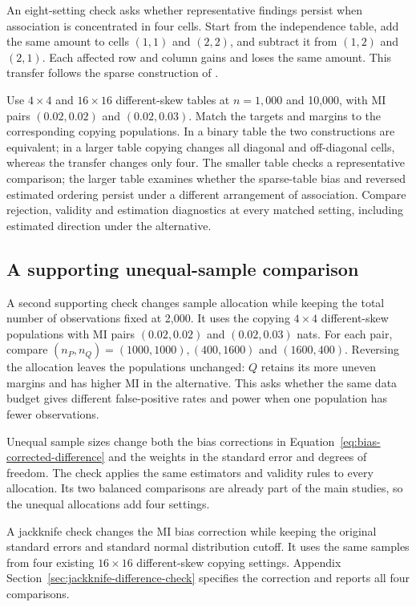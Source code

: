 An eight-setting check asks whether representative findings persist when
association is concentrated in four cells. Start from the independence
table, add the same amount to cells \((1,1)\) and \((2,2)\), and subtract
it from \((1,2)\) and \((2,1)\). Each affected row and column gains and
loses the same amount. This transfer follows the sparse construction of
\citet[Section~3(b)]{berrett2021}.

Use \(4\times4\) and \(16\times16\) different-skew tables at
\(n=1{,}000\) and 10,000,
with MI pairs \((0.02,0.02)\) and \((0.02,0.03)\). Match the targets
and margins to the corresponding copying populations. In a binary table
the two constructions are equivalent; in a larger table copying changes
all diagonal and off-diagonal cells, whereas the transfer changes only four.
The smaller table checks a representative comparison; the larger table
examines whether the sparse-table bias and reversed estimated ordering
persist under a different arrangement of association. Compare rejection,
validity and estimation diagnostics at every matched setting, including
estimated direction under the alternative.

\subsection{A supporting unequal-sample comparison}

A second supporting check changes sample allocation while keeping the
total number of observations fixed at 2,000. It uses the copying
\(4\times4\) different-skew populations with MI pairs
\((0.02,0.02)\) and \((0.02,0.03)\) nats. For each pair, compare
\((n_P,n_Q)=(1000,1000),(400,1600)\) and \((1600,400)\).
Reversing the allocation leaves the populations unchanged: \(Q\) retains
its more uneven margins and has higher MI in the alternative.
This asks whether the same data budget gives different false-positive
rates and power when one population has fewer observations.

Unequal sample sizes change both the bias corrections in
Equation~\eqref{eq:bias-corrected-difference} and the weights in the
standard error and degrees of freedom. The check applies the same
estimators and validity rules to every allocation. Its two balanced
comparisons are already part of the main studies, so the unequal
allocations add four settings.

\medskip
{}

A jackknife check changes the MI bias correction while keeping the
original standard errors and standard normal distribution cutoff. It
uses the same samples from four existing \(16\times16\) different-skew
copying settings. Appendix Section~\ref{sec:jackknife-difference-check}
specifies the correction and reports all four comparisons.

